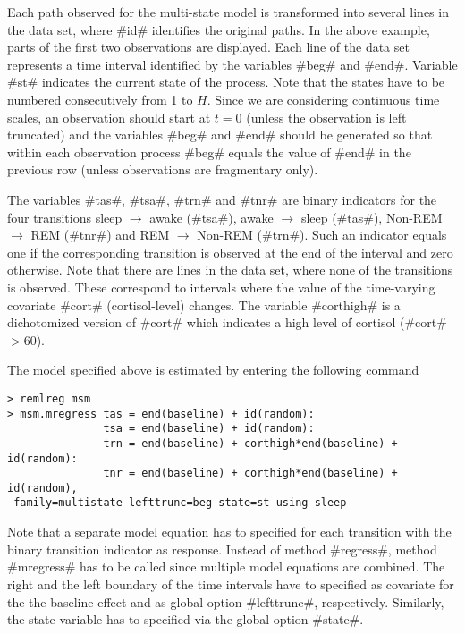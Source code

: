 Each path observed for the multi-state model is transformed into
several lines in the data set, where #id# identifies the original
paths. In the above example, parts of the first two observations are
displayed. Each line of the data set represents a time interval
identified by the variables #beg# and #end#. Variable #st# indicates
the current state of the process. Note that the states have to be
numbered consecutively from 1 to $H$. Since we are considering
continuous time scales, an observation should start at $t=0$ (unless
the observation is left truncated) and the variables #beg# and #end#
should be generated so that within each observation process #beg#
equals the value of #end# in the previous row (unless observations
are fragmentary only).

The variables #tas#, #tsa#, #trn# and #tnr# are binary indicators
for the four transitions sleep $\rightarrow$ awake (#tsa#), awake
$\rightarrow$ sleep (#tas#), Non-REM $\rightarrow$ REM (#tnr#) and
REM $\rightarrow$ Non-REM (#trn#). Such an indicator equals one if
the corresponding transition is observed at the end of the interval
and zero otherwise. Note that there are lines in the data set, where
none of the transitions is observed. These correspond to intervals
where the value of the time-varying covariate #cort#
(cortisol-level) changes. The variable #corthigh# is a dichotomized
version of #cort# which indicates a high level of cortisol
(#cort#$>$60).

The model specified above is estimated by entering the following
command

\label{msm_code}
\begin{verbatim}
> remlreg msm
> msm.mregress tas = end(baseline) + id(random):
               tsa = end(baseline) + id(random):
               trn = end(baseline) + corthigh*end(baseline) + id(random):
               tnr = end(baseline) + corthigh*end(baseline) + id(random),
 family=multistate lefttrunc=beg state=st using sleep
\end{verbatim}

Note that a separate model equation has to specified for each
transition with the binary transition indicator as response. Instead
of method #regress#, method #mregress# has to be called since
multiple model equations are combined. The right and the left
boundary of the time intervals have to specified as covariate for
the the baseline effect and as global option #lefttrunc#,
respectively. Similarly, the state variable has to specified via the
global option #state#.

